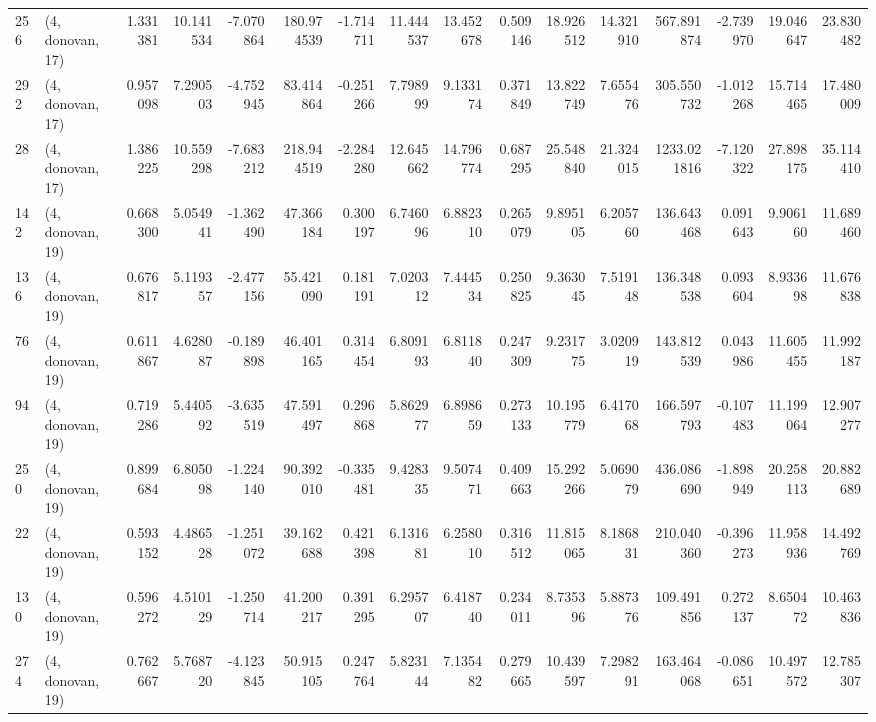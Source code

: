 \begin{tabular}{llrrrrrrrrrrrrrr}
256 &  (4, donovan, 17) &   1.331381 &  10.141534 &  -7.070864 &   180.974539 &  -1.714711 &  11.444537 &  13.452678 &  0.509146 &  18.926512 &  14.321910 &   567.891874 &  -2.739970 &  19.046647 &  23.830482 \\
292 &  (4, donovan, 17) &   0.957098 &   7.290503 &  -4.752945 &    83.414864 &  -0.251266 &   7.798999 &   9.133174 &  0.371849 &  13.822749 &   7.655476 &   305.550732 &  -1.012268 &  15.714465 &  17.480009 \\
28  &  (4, donovan, 17) &   1.386225 &  10.559298 &  -7.683212 &   218.944519 &  -2.284280 &  12.645662 &  14.796774 &  0.687295 &  25.548840 &  21.324015 &  1233.021816 &  -7.120322 &  27.898175 &  35.114410 \\
142 &  (4, donovan, 19) &   0.668300 &   5.054941 &  -1.362490 &    47.366184 &   0.300197 &   6.746096 &   6.882310 &  0.265079 &   9.895105 &   6.205760 &   136.643468 &   0.091643 &   9.906160 &  11.689460 \\
136 &  (4, donovan, 19) &   0.676817 &   5.119357 &  -2.477156 &    55.421090 &   0.181191 &   7.020312 &   7.444534 &  0.250825 &   9.363045 &   7.519148 &   136.348538 &   0.093604 &   8.933698 &  11.676838 \\
76  &  (4, donovan, 19) &   0.611867 &   4.628087 &  -0.189898 &    46.401165 &   0.314454 &   6.809193 &   6.811840 &  0.247309 &   9.231775 &   3.020919 &   143.812539 &   0.043986 &  11.605455 &  11.992187 \\
94  &  (4, donovan, 19) &   0.719286 &   5.440592 &  -3.635519 &    47.591497 &   0.296868 &   5.862977 &   6.898659 &  0.273133 &  10.195779 &   6.417068 &   166.597793 &  -0.107483 &  11.199064 &  12.907277 \\
250 &  (4, donovan, 19) &   0.899684 &   6.805098 &  -1.224140 &    90.392010 &  -0.335481 &   9.428335 &   9.507471 &  0.409663 &  15.292266 &   5.069079 &   436.086690 &  -1.898949 &  20.258113 &  20.882689 \\
22  &  (4, donovan, 19) &   0.593152 &   4.486528 &  -1.251072 &    39.162688 &   0.421398 &   6.131681 &   6.258010 &  0.316512 &  11.815065 &   8.186831 &   210.040360 &  -0.396273 &  11.958936 &  14.492769 \\
130 &  (4, donovan, 19) &   0.596272 &   4.510129 &  -1.250714 &    41.200217 &   0.391295 &   6.295707 &   6.418740 &  0.234011 &   8.735396 &   5.887376 &   109.491856 &   0.272137 &   8.650472 &  10.463836 \\
274 &  (4, donovan, 19) &   0.762667 &   5.768720 &  -4.123845 &    50.915105 &   0.247764 &   5.823144 &   7.135482 &  0.279665 &  10.439597 &   7.298291 &   163.464068 &  -0.086651 &  10.497572 &  12.785307 \\

\end{tabular}
